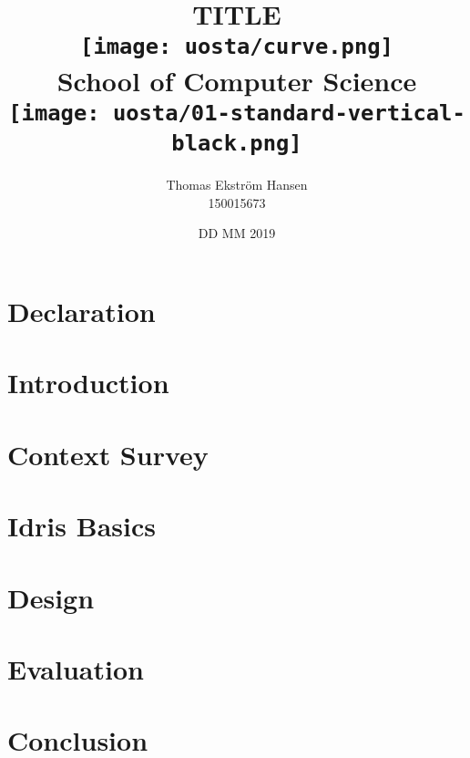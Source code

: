 \documentclass[12pt]{report}
\title{
    {TITLE}\\
    \vspace{2cm}
    {\texttt{[image: uosta/curve.png]}}\\
    {\fontfamily{ppl}\selectfont\large School of Computer Science}\\
    \vspace{-0.8cm}
    {\texttt{[image: uosta/01-standard-vertical-black.png]}}\\
    \vspace{-2cm}
}
\author{
    {Thomas Ekstr{\" o}m Hansen}\\
    {150015673}
}
\date{DD MM 2019}
\begin{document}
    \maketitle
    
    \chapter*{Declaration}
    
    
    \tableofcontents
    
    \chapter{Introduction}
    
    
    \chapter{Context Survey}
    
    
    \chapter{Idris Basics}
    
        
    \chapter{Design}
    
    
    \chapter{Evaluation}
    
        
    \chapter{Conclusion}
    
    
    
    
\end{document}
